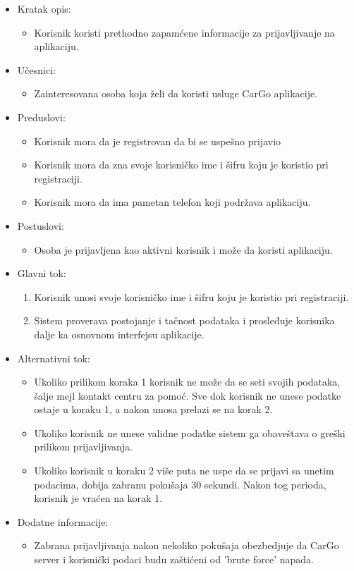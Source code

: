 \begin{itemize}
    \item Kratak opis:
        \begin{itemize}
            \item Korisnik koristi prethodno zapamćene informacije za prijavljivanje na aplikaciju.
        \end{itemize}
    \item Učesnici:
        \begin{itemize}
            \item Zainteresovana osoba koja želi da koristi usluge CarGo aplikacije.
        \end{itemize}
    \item Preduslovi:
        \begin{itemize}
            \item Korisnik mora da je registrovan da bi se uspešno prijavio
            \item Korisnik mora da zna svoje korisničko ime i šifru koju je koristio pri registraciji.
            \item Korisnik mora da ima pametan telefon koji podržava aplikaciju.
        \end{itemize}
    \item Postuslovi:
        \begin{itemize}
            \item Osoba je prijavljena kao aktivni korisnik i može da koristi aplikaciju.
        \end{itemize}
    \item Glavni tok:
        \begin{enumerate}
            \item Korisnik unosi svoje korisničko ime i šifru koju je koristio pri registraciji.
            \item Sistem proverava postojanje i tačnost podataka i prosleđuje korisnika dalje ka osnovnom interfejsu aplikacije.
        \end{enumerate}
    \item Alternativni tok:
        \begin{itemize}
            \item Ukoliko prilikom koraka 1 korisnik ne može da se seti svojih podataka, šalje mejl kontakt centru za pomoć. Sve dok korisnik ne unese podatke ostaje u koraku 1, a nakon unosa prelazi se na korak 2.
			\item Ukoliko korisnik ne unese validne podatke sistem ga obaveštava o greški prilikom prijavljivanja.
            \item Ukoliko korisnik u koraku 2 više puta ne uspe da se prijavi sa unetim podacima, dobija zabranu pokušaja 30 sekundi. Nakon tog perioda, korisnik je vraćen na korak 1.
        \end{itemize}
    \item Dodatne informacije:
        \begin{itemize}
            \item Zabrana prijavljivanja nakon nekoliko pokušaja obezbedjuje da CarGo server i korisnički podaci budu zaštićeni od 'brute force' napada.
        \end{itemize}
\end{itemize}


